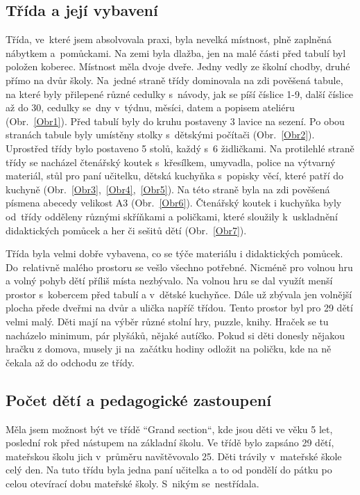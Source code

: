 		\subsection{Třída a její vybavení}
		\label{sec:tridaVybaveni}
			Třída, ve které jsem absolvovala praxi, byla nevelká místnost, plně zaplněná nábytkem a pomůckami. Na zemi byla dlažba, jen na malé části před tabulí byl položen koberec. Místnost měla dvoje dveře. Jedny vedly ze školní chodby, druhé přímo na dvůr školy. Na jedné straně třídy dominovala na zdi pověšená tabule, na které byly přilepené různé cedulky s návody, jak se píší číslice 1-9, další číslice až do 30, cedulky se dny v týdnu, měsíci, datem a popisem ateliéru (Obr.~\ref{Obr1}). Před tabulí byly do kruhu postaveny 3 lavice na sezení. Po obou stranách tabule byly umístěny stolky s dětskými počítači (Obr.~\ref{Obr2}). Uprostřed třídy bylo postaveno 5 stolů, každý s 6 židličkami. Na protilehlé straně třídy se nacházel čtenářský koutek s křesílkem, umyvadla, police na výtvarný materiál, stůl pro paní učitelku, dětská kuchyňka s popisky věcí, které patří do kuchyně (Obr.~\ref{Obr3},~\ref{Obr4},~\ref{Obr5}). Na této straně byla na zdi pověšená písmena abecedy velikost A3 (Obr.~\ref{Obr6}). Čtenářský koutek i kuchyňka byly od třídy odděleny různými skříňkami a poličkami, které sloužily k uskladnění didaktických pomůcek a her či sešitů dětí (Obr.~\ref{Obr7}).


			Třída byla velmi dobře vybavena, co se týče materiálu i didaktických pomůcek. Do relativně malého prostoru se vešlo všechno potřebné. Nicméně pro volnou hru a volný pohyb dětí příliš místa nezbývalo. Na volnou hru se dal využít menší prostor s kobercem před tabulí a v dětské kuchyňce. Dále už zbývala jen volnější plocha přede dveřmi na dvůr a ulička napříč třídou. Tento prostor byl pro 29 dětí velmi malý. 
			Děti mají na výběr různé stolní hry, puzzle, knihy. Hraček se tu nacházelo minimum, pár plyšáků, nějaké autíčko. Pokud si děti donesly nějakou hračku z domova, musely ji na začátku hodiny odložit na poličku, kde na ně čekala až do odchodu ze třídy. 

		\subsection{Počet dětí a pedagogické zastoupení}

			Měla jsem možnost být ve třídě “Grand section“, kde jsou děti ve věku 5 let, poslední rok před nástupem na základní školu. Ve třídě bylo zapsáno 29 dětí, mateřskou školu jich v průměru navštěvovalo 25. Děti trávily v mateřské škole celý den. Na tuto třídu byla jedna paní učitelka a to od pondělí do pátku po celou otevírací dobu mateřské školy. S nikým se nestřídala. 

